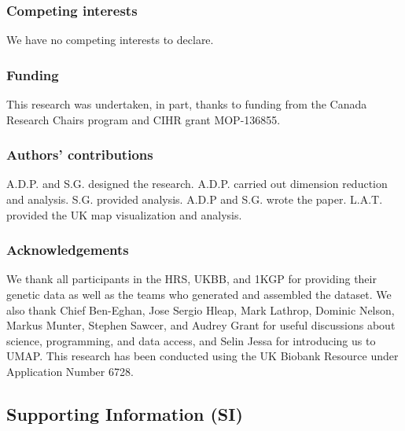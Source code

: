 \documentclass[12pt]{pnas-new}
\newcommand{\beginsupplement}{%
        \setcounter{table}{0}
        \renewcommand{\thetable}{S\arabic{table}}%
        \setcounter{figure}{0}
        \renewcommand{\thefigure}{S\arabic{figure}}%
     }
\begin{document}
\subsubsection*{Competing interests}
We have no competing interests to declare.

\subsubsection*{Funding}
This research was undertaken, in part, thanks to funding from the Canada Research Chairs program and CIHR grant MOP-136855.

\subsubsection*{Authors' contributions}
A.D.P. and S.G. designed the research. A.D.P. carried out dimension reduction and analysis. S.G. provided analysis. A.D.P and S.G. wrote the paper. L.A.T. provided the UK map visualization and analysis.

\subsubsection*{Acknowledgements}
We thank all participants in the HRS, UKBB, and 1KGP for providing their genetic data as well as the teams who generated and assembled the dataset. We also thank Chief Ben-Eghan, Jose Sergio Hleap, Mark Lathrop, Dominic Nelson, Markus Munter, Stephen Sawcer, and Audrey Grant for useful discussions about science, programming, and data access, and Selin Jessa for introducing us to UMAP. This research has been conducted using the UK Biobank Resource under Application Number 6728.



\newpage

\beginsupplement
\subsection*{Supporting Information (SI)}
\end{document}
